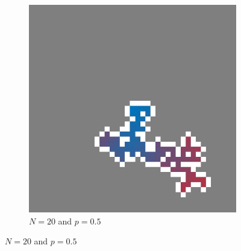 \begin{figure}[t!]
	\begin{subfigure}{0.50\columnwidth}
		\centering
		\includegraphics[width=\textwidth]{./img/fancy_cluster_N20_p5_rng_8}
		\caption{$N = 20$ and $p = 0.5$}
		\label{fig:method:fin_inf:finiteLarge}
	\end{subfigure}


\end{figure}
